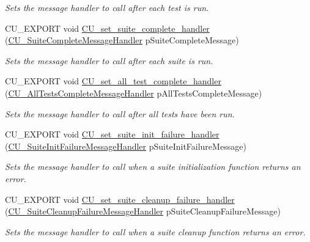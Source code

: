 \begin{DoxyCompactItemize}
\begin{DoxyCompactList}\small\item\em Sets the message handler to call after each test is run. \end{DoxyCompactList}\item 
C\-U\-\_\-\-E\-X\-P\-O\-R\-T void \hyperlink{group__Framework_ga06f5a0d1ecfd98c65d3c2382e608aa43}{C\-U\-\_\-set\-\_\-suite\-\_\-complete\-\_\-handler} (\hyperlink{group__Framework_gafe19dbdf8b13029d10e9463bc698be58}{C\-U\-\_\-\-Suite\-Complete\-Message\-Handler} p\-Suite\-Complete\-Message)
\begin{DoxyCompactList}\small\item\em Sets the message handler to call after each suite is run. \end{DoxyCompactList}\item 
C\-U\-\_\-\-E\-X\-P\-O\-R\-T void \hyperlink{group__Framework_ga875c98c7ec5df1a0450f1054a91506fb}{C\-U\-\_\-set\-\_\-all\-\_\-test\-\_\-complete\-\_\-handler} (\hyperlink{group__Framework_ga5c8cffc5ce2801990436b3e6992bf770}{C\-U\-\_\-\-All\-Tests\-Complete\-Message\-Handler} p\-All\-Tests\-Complete\-Message)
\begin{DoxyCompactList}\small\item\em Sets the message handler to call after all tests have been run. \end{DoxyCompactList}\item 
C\-U\-\_\-\-E\-X\-P\-O\-R\-T void \hyperlink{group__Framework_ga26036d28d4635ce2b87258d2dc328afa}{C\-U\-\_\-set\-\_\-suite\-\_\-init\-\_\-failure\-\_\-handler} (\hyperlink{group__Framework_ga53faf49a6045a1fc32c5a0287b800b65}{C\-U\-\_\-\-Suite\-Init\-Failure\-Message\-Handler} p\-Suite\-Init\-Failure\-Message)
\begin{DoxyCompactList}\small\item\em Sets the message handler to call when a suite initialization function returns an error. \end{DoxyCompactList}\item 
C\-U\-\_\-\-E\-X\-P\-O\-R\-T void \hyperlink{group__Framework_gadd76507e33f51ce0c257593187524a37}{C\-U\-\_\-set\-\_\-suite\-\_\-cleanup\-\_\-failure\-\_\-handler} (\hyperlink{group__Framework_ga67a720062975e6b7f97df16a1e8e10ce}{C\-U\-\_\-\-Suite\-Cleanup\-Failure\-Message\-Handler} p\-Suite\-Cleanup\-Failure\-Message)
\begin{DoxyCompactList}\small\item\em Sets the message handler to call when a suite cleanup function returns an error. \end{DoxyCompactList}\item 

\end{DoxyCompactItemize}
